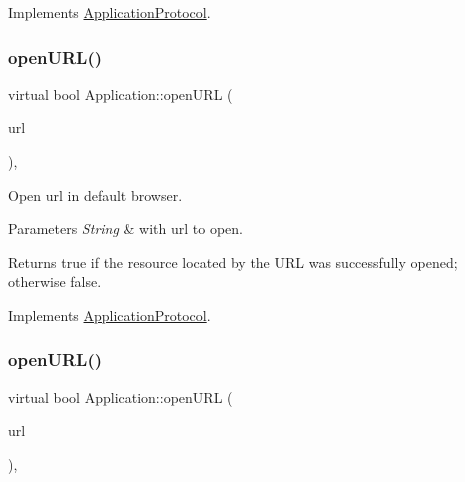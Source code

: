 Implements \hyperlink{classApplicationProtocol_a152a977b301a90253ec5a6533b2e8e04}{Application\+Protocol}.

\mbox{\label{classApplication_a13ccf5ab932de8a22255b56d085bed59}} 
\subsubsection{\texorpdfstring{open\+U\+R\+L()}{openURL()}\hspace{0.1cm}{\footnotesize\ttfamily [11/12]}}
{\footnotesize\ttfamily virtual bool Application\+::open\+U\+RL (\begin{DoxyParamCaption}\item[{const std\+::string \&}]{url }\end{DoxyParamCaption})\hspace{0.3cm}{\ttfamily [override]}, {\ttfamily [virtual]}}



Open url in default browser. 


\begin{DoxyParams}{Parameters}
{\em String} & with url to open. \\
\hline
\end{DoxyParams}
\begin{DoxyReturn}{Returns}
true if the resource located by the U\+RL was successfully opened; otherwise false. 
\end{DoxyReturn}


Implements \hyperlink{classApplicationProtocol_a152a977b301a90253ec5a6533b2e8e04}{Application\+Protocol}.

\mbox{\label{classApplication_a13ccf5ab932de8a22255b56d085bed59}} 
\subsubsection{\texorpdfstring{open\+U\+R\+L()}{openURL()}\hspace{0.1cm}{\footnotesize\ttfamily [12/12]}}
{\footnotesize\ttfamily virtual bool Application\+::open\+U\+RL (\begin{DoxyParamCaption}\item[{const std\+::string \&}]{url }\end{DoxyParamCaption})\hspace{0.3cm}{\ttfamily [override]}, {\ttfamily [virtual]}}




